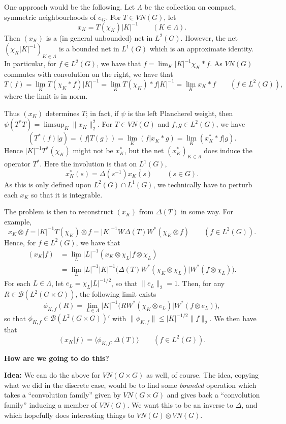 \documentclass[twoside,a4paper]{article}
\theoremstyle{definition}
\theoremstyle{remark}
\newcommand{\mc}{\mathcal}
\newcommand{\ip}[2]{\langle{#1},{#2}\rangle}
\begin{document}
One approach would be the following.  Let $\Lambda$ be the collection on compact,
symmetric neighbourhoods of $e_G$.  For $T\in VN(G)$, let
\[ x_K = T(\chi_K) |K|^{-1} \qquad (K\in\Lambda). \]
Then $(x_K)$ is a (in general unbounded) net in $L^2(G)$.  However, the net
$(\chi_K |K|^{-1})_{K\in\Lambda}$ is a bounded net in $L^1(G)$ which is an approximate
identity.  In particular, for $f\in L^2(G)$, we have that $f = \lim_K |K|^{-1}
\chi_K * f$.  As $VN(G)$ commutes with convolution on the right, we have that
\[ T(f) = \lim_K T(\chi_K*f) |K|^{-1} = \lim_K T(\chi_K)*f |K|^{-1}
= \lim_K x_K * f \qquad (f\in L^2(G)), \]
where the limit is in norm.

Thus $(x_K)$ determines $T$; in fact, if $\psi$ is the left Plancherel weight, then
$\psi(T^*T) = \limsup_K \|x_K\|_2^2$.  For $T\in VN(G)$ and $f,g\in L^2(G)$, we have
\[ (T^*(f)|g) = (f|T(g)) = \lim_K (f|x_K*g) = \lim_K (x_K^* * f|g). \]
Hence $|K|^{-1} T^*(\chi_K)$ might not be $x_K^*$, but the net $(x_K^*)_{K\in\Lambda}$
does induce the operator $T^*$.  Here the involution is that on $L^1(G)$,
\[ x_K^*(s) = \Delta(s^{-1}) \overline{ x_K(s) } \qquad (s\in G). \]
As this is only defined upon $L^2(G) \cap L^1(G)$, we technically have to perturb
each $x_K$ so that it is integrable.

The problem is then to reconstruct $(x_K)$ from $\Delta(T)$ in some way.  For example,
\[ x_K\otimes f = |K|^{-1} T(\chi_K)\otimes f = |K|^{-1} W\Delta(T)W^*(\chi_K\otimes f)
\qquad (f\in L^2(G)). \]
Hence, for $f\in L^2(G)$, we have that
\begin{align*} (x_K|f) &= \lim_L |L|^{-1} (x_K\otimes\chi_L | f\otimes \chi_L) \\
&= \lim_L |L|^{-1} |K|^{-1} \big( \Delta(T)W^*(\chi_K\otimes \chi_L) |
   W^*(f\otimes\chi_L) \big).
\end{align*}
For each $L\in\Lambda$, let $e_L = \chi_L |L|^{-1/2}$, so that $\|e_L\|_2=1$.  Then,
for any $R\in\mc B(L^2(G\times G))$, the following limit exists
\[ \phi_{K,f}(R) = \lim_{L\in\Lambda} |K|^{-1} \big( RW^*(\chi_K\otimes e_L) |
W^*(f\otimes e_L) \big), \]
so that $\phi_{K,f}\in\mc B(L^2(G\times G))'$ with $\|\phi_{K,f}\|\leq |K|^{-1/2}
\|f\|_2$.  We then have that
\[ (x_K|f) = \ip{\phi_{K,f}}{\Delta(T)} \qquad (f\in L^2(G)). \]

\textbf{How are we going to do this?}

\noindent\textbf{Idea:}
We can do the above for $VN(G\times G)$ as well, of course.  The idea, copying what we
did in the discrete case, would be to find some \emph{bounded} operation which takes
a ``convolution family'' given by $VN(G\times G)$ and gives back a ``convolution
family'' inducing a member of $VN(G)$.  We want this to be an inverse to $\Delta$, and
which hopefully does interesting things to $VN(G) \otimes VN(G)$.
\end{document}
